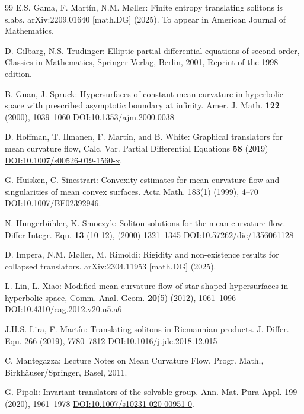 \documentclass{amsart}[12pt]
\newcommand{\DOI}[1]{\href{https://doi.org/#1}{DOI:#1}}
\theoremstyle{definition}
\theoremstyle{plain}
\newcommand{\vt}{\vspace{.1cm}}
\begin{document}
\begin{thebibliography}{99}
 E.S. Gama, F. Martín, N.M. M{\o}ller: Finite entropy translating solitons is slabs.
arXiv:2209.01640 [math.DG] (2025). To appear in  American Journal of Mathematics.


\vt

 D. Gilbarg, N.S. Trudinger: Elliptic partial differential equations of second order,
Classics in Mathematics, Springer-Verlag, Berlin, 2001, Reprint of the 1998 edition.

\vt

 B. Guan, J. Spruck: Hypersurfaces of constant mean curvature in hyperbolic space
with prescribed asymptotic boundary at infinity. Amer. J. Math.
{\bf 122} (2000), 1039--1060 \DOI{10.1353/ajm.2000.0038}


\vt

 D. Hoffman, T. Ilmanen, F. Martín, and B. White: Graphical translators for mean
curvature flow, Calc. Var. Partial Differential Equations {\bf 58} (2019) \DOI{10.1007/s00526-019-1560-x}.

\vt

 G. Huisken, C. Sinestrari: Convexity estimates for mean curvature flow and singularities of mean
convex surfaces. Acta Math. 183(1) (1999), 4--70 \DOI{10.1007/BF02392946}.


\vt

 N. Hungerbühler, K. Smoczyk: Soliton solutions for the mean curvature flow. Differ Integr. Equ. {\bf 13} (10-12),
(2000) 1321--1345 \DOI{10.57262/die/1356061128}

\vt

 D. Impera, N.M. Møller, M. Rimoldi: Rigidity and non-existence results for collapsed translators.
arXiv:2304.11953 [math.DG] (2025).
\vt

 L. Lin, L. Xiao: Modified mean curvature flow of star-shaped hypersurfaces
in hyperbolic space, Comm. Anal. Geom. {\bf 20}(5) (2012), 1061--1096
\DOI{10.4310/cag.2012.v20.n5.a6}

\vt

 J.H.S. Lira, F. Martín: Translating solitons in Riemannian products. J. Differ. Equ. 266
(2019), 7780--7812 \DOI{10.1016/j.jde.2018.12.015}


\vt

 C. Mantegazza: Lecture Notes on Mean Curvature Flow, Progr. Math., Birkhäuser/Springer, Basel, 2011.


\vt

 G. Pipoli:  Invariant translators of the solvable group. Ann. Mat. Pura Appl. 199 (2020), 1961--1978
\DOI{10.1007/s10231-020-00951-0}.


\end{thebibliography}
\end{document}
